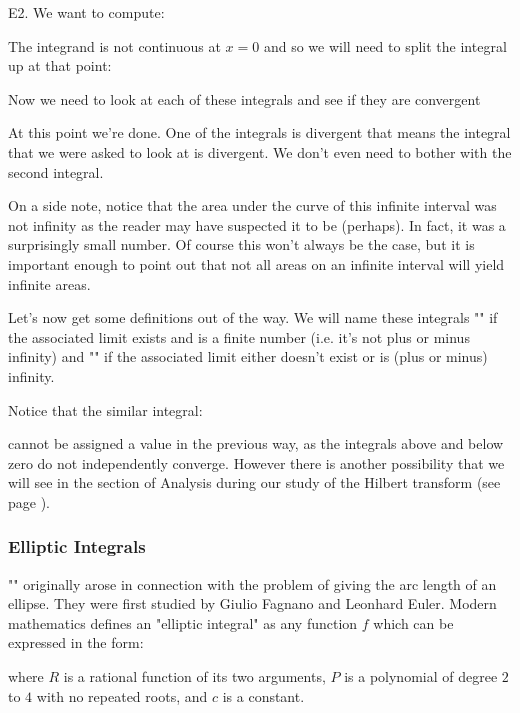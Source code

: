 	\begin{tcolorbox}[colframe=black,colback=white,sharp corners]
	
	E2. We want to compute:
	
	The integrand is not continuous at $x=0$ and so we will need to split the integral up at that point:
	
	Now we need to look at each of these integrals and see if they are convergent
	
	At this point we're done.  One of the integrals is divergent that means the integral that we were asked to look at is divergent.  We don't even need to bother with the second integral.
	\end{tcolorbox}
	On a side note, notice that the area under the curve of this infinite interval was not infinity as the reader may have suspected it to be (perhaps).  In fact, it was a surprisingly small number.  Of course this won't always be the case, but it is important enough to point out that not all areas on an infinite interval will yield infinite areas.
 
	Let's now get some definitions out of the way.  We will name these integrals "" if the associated limit exists and is a finite number (i.e. it's not plus or minus infinity) and "" if the associated limit either doesn't exist or is (plus or minus) infinity.
	
	Notice that the similar integral:
	
	cannot be assigned a value in the previous way, as the integrals above and below zero do not independently converge. However there is another possibility that we will see in the section of Analysis during our study of the Hilbert transform (see page \pageref{hilbert transform}).
	
	\pagebreak
	\subsubsection{Elliptic Integrals}\label{elliptic integrals}
	"" originally arose in connection with the problem of giving the arc length of an ellipse. They were first studied by Giulio Fagnano and Leonhard Euler. Modern mathematics defines an "elliptic integral" as any function $f$ which can be expressed in the form:
	
	where $R$ is a rational function of its two arguments, $P$ is a polynomial of degree $2$ to $4$ with no repeated roots, and $c$ is a constant.

